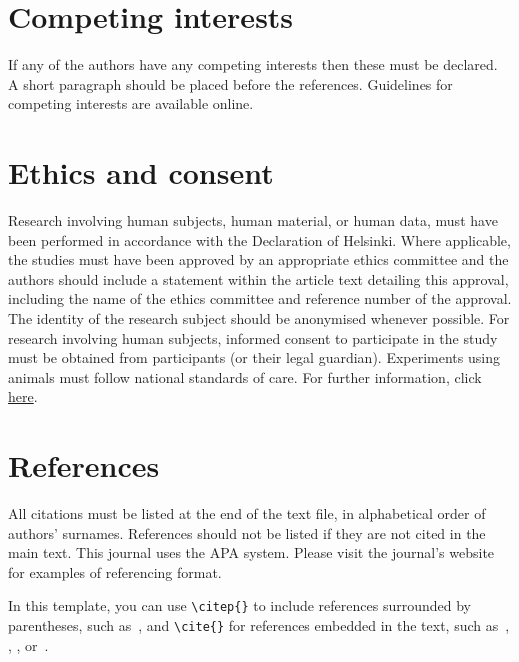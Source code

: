 \documentclass{article}
\begin{document}
\section{Competing interests}

If any of the authors have any competing interests then these
must be declared. A short paragraph should be placed before
the references.
Guidelines for competing interests are available online.%

\section{Ethics and consent}

Research involving human subjects, human material, or human data,
must have been performed in accordance with the Declaration of Helsinki.
Where applicable, the studies must have been approved by an appropriate
ethics committee and the authors should include a statement within
the article text detailing this approval, including the name of the ethics committee and reference number of the approval.
The identity of the research subject should be anonymised whenever possible.
For research involving human subjects, informed consent to participate
in the study must be obtained from participants (or their legal guardian).
%
Experiments using animals must follow national standards of care.
For further information, click \href{http://bit.ly/1rBoe0S}{here}.


\section{References}

All citations must be listed at the end of the text file,
in alphabetical order of authors' surnames.
References should not be listed if they are not cited in
the main text.
This journal uses the APA system.
Please visit the journal's website
for examples of referencing format.

In this template, you can use \verb=\citep{}= to include references
surrounded by parentheses, such as~\citep{KneesS16_MusicSimilarityRetrieval_SPRINGER}, and \verb=\cite{}=
for references embedded in the text,
such as~\cite{WeihsJVR16_MusicDataAnalysis_CRC},
\cite{SerraEtAl13_RoadmapMIR_CreativeCommon},
\cite{Lerch15_AudioContentAnalysis_WILEY},
or~\cite{Mueller15_FMP_SPRINGER}.
\end{document}
